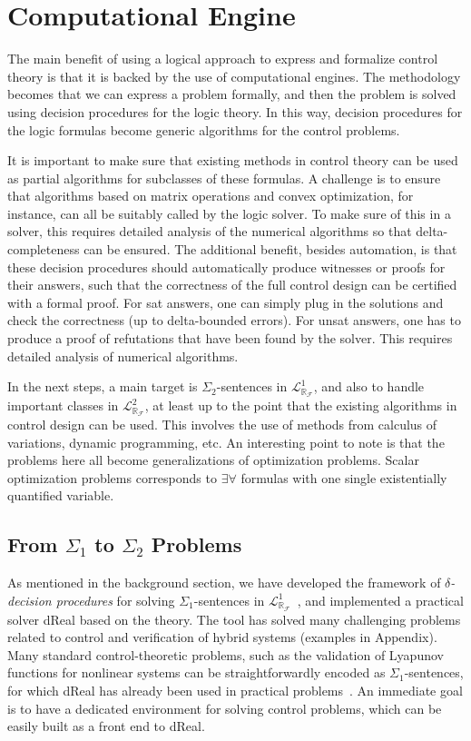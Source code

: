\documentclass[11pt]{article}
\newcommand{\lrf}{\mathcal{L}_{\mathbb{R}_{\mathcal{F}}}}
\theoremstyle{definition}
\begin{document}
\section{Computational Engine}\label{ce}

The main benefit of using a logical approach to express and formalize control theory is that it is backed by the use of computational engines. The methodology becomes that we can express a problem formally, and then the problem is solved using decision procedures for the logic theory. In this way, decision procedures for the logic formulas become generic algorithms for the control problems. 

It is important to make sure that existing methods in control theory can be used as partial algorithms for subclasses of these formulas. A challenge is to ensure that algorithms based on matrix operations and convex optimization, for instance, can all be suitably called by the logic solver. To make sure of this in a solver, this requires detailed analysis of the numerical algorithms so that delta-completeness can be ensured. The additional benefit, besides automation, is that these decision procedures should automatically produce witnesses or proofs for their answers, such that the correctness of the full control design can be certified with a formal proof. For sat answers, one can simply plug in the solutions and check the correctness (up to delta-bounded errors). For unsat answers, one has to produce a proof of refutations that have been found by the solver. This requires detailed analysis of numerical algorithms.

In the next steps, a main target is $\Sigma_2$-sentences in $\lrf^1$, and also to handle important classes in $\lrf^2$, at least up to the point that the existing algorithms in control design can be used. This involves the use of methods from calculus of variations, dynamic programming, etc. An interesting point to note is that the problems here all become generalizations of optimization problems. Scalar optimization problems corresponds to $\exists\forall$ formulas with one single existentially quantified variable. 

\subsection{From $\Sigma_1$ to $\Sigma_2$ Problems} 

As mentioned in the background section, we have developed the framework of {\em $\delta$-decision procedures} for solving $\Sigma_1$-sentences in $\lrf^1$~\cite{DBLP:conf/cade/GaoAC12}, and implemented a practical solver dReal based on the theory. The tool has solved many challenging problems related to control and verification of hybrid systems (examples in Appendix). Many standard control-theoretic problems, such as the validation of Lyapunov functions for nonlinear systems can be straightforwardly encoded as $\Sigma_1$-sentences, for which dReal has already been used in practical problems~\cite{DBLP:conf/hybrid/KapinskiDSA14}. An immediate goal is to have a dedicated environment for solving control problems, which can be easily built as a front end to dReal. 
\end{document}
